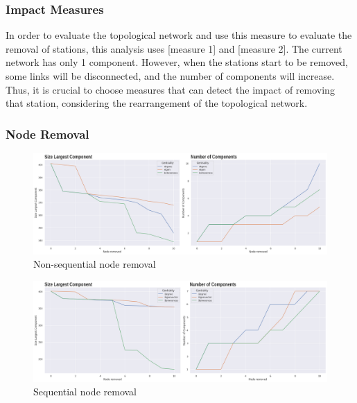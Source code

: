 \documentclass[10pt]{report}
\numberwithin{figure}{section}
\numberwithin{table}{section}
\begin{document}
\newpage    

\subsubsection{Impact Measures} 

In order to evaluate the topological network and use this measure to evaluate the removal of stations, this analysis uses [measure 1] and [measure 2]. The current network has only 1 component. However, when the stations start to be removed, some links will be disconnected, and the number of components will increase. Thus, it is crucial to choose measures that can detect the impact of removing that station, considering the rearrangement of the topological network. 

\subsubsection{Node Removal} 

    \begin{figure}[htp]
        \centering
        \includegraphics[width=16cm]{Image/Part1_nonsequential_Summarise.png}
        \caption{Non-sequential node removal}
        \label{fig:galaxy}
    \end{figure}


    \begin{figure}[htp]
        \centering
        \includegraphics[width=16cm]{Image/Part1_sequential_Summarise.png}
        \caption{Sequential node removal}
        \label{fig:galaxy}
    \end{figure}
\end{document}
